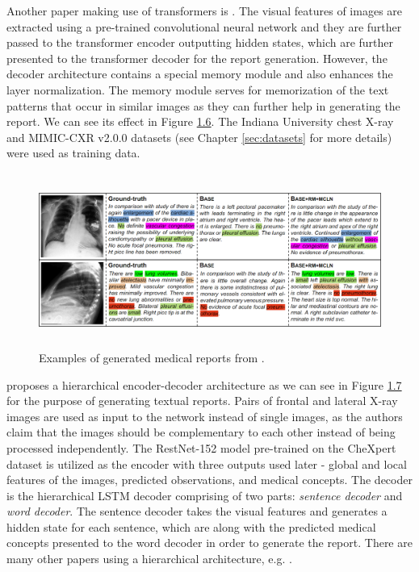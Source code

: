 Another paper making use of transformers is \citet{chen2020generating}. The visual features of images are extracted using a pre-trained convolutional neural network and they are further passed to the transformer encoder outputting hidden states, which are further presented to the transformer decoder for the report generation. However, the decoder architecture contains a special memory module and also enhances the layer normalization. The memory module serves for memorization of the text patterns that occur in similar images as they can further help in generating the report. We can see its effect in Figure \hyperref[fig06:ZhihongExample]{1.6}. The Indiana University chest X-ray and MIMIC-CXR v2.0.0 datasets (see Chapter \ref{sec:datasets} for more details) were used as training data.\\

\begin{figure}[h]\centering
\includegraphics[width=145mm, height=57mm]{../img/ZhihongExample}
\caption{Examples of generated medical reports from \citet{chen2020generating}.}
\label{fig06:ZhihongExample}
\end{figure}

\citet{yuan2019automatic} proposes a hierarchical encoder-decoder architecture as we can see in Figure \hyperref[fig07:YuanExample]{1.7} for the purpose of generating textual reports. Pairs of frontal and lateral X-ray images are used as input to the network instead of single images, as the authors claim that the images should be complementary to each other instead of being processed independently. The RestNet-152 model pre-trained on the CheXpert\citep{irvin2019chexpert} dataset is utilized as the encoder with three outputs used later - global and local features of the images, predicted observations, and medical concepts. The decoder is the hierarchical LSTM decoder comprising of two parts: \textit{sentence decoder} and \textit{word decoder}. The sentence decoder takes the visual features and generates a hidden state for each sentence, which are along with the predicted medical concepts presented to the word decoder in order to generate the report. There are many other papers using a hierarchical architecture, e.g. \citet{huang2019multi}. \\

